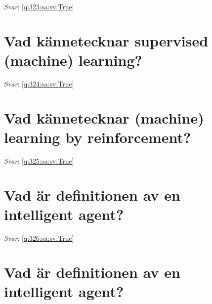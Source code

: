 \documentclass[a4paper,11pt,oneside]{book}
\begin{document}
\begin{sloppypar}
\vspace{1cm}

\textit{Svar}: \autoref{q:323:sa:sv:True}



\section{Vad k\"annetecknar supervised (machine) learning?}

\label{q:324:sa:sv:False}

\vspace{2cm}

\noindent\makebox[\textwidth]{\hrulefill}

\vspace{1cm}

\textit{Svar}: \autoref{q:324:sa:sv:True}



\section{Vad k\"annetecknar (machine) learning by reinforcement?}

\label{q:325:sa:sv:False}

\vspace{2cm}

\noindent\makebox[\textwidth]{\hrulefill}

\vspace{1cm}

\textit{Svar}: \autoref{q:325:sa:sv:True}



\section{Vad \"ar definitionen av en intelligent agent?}

\label{q:326:sa:sv:False}

\vspace{2cm}

\noindent\makebox[\textwidth]{\hrulefill}

\vspace{1cm}

\textit{Svar}: \autoref{q:326:sa:sv:True}



\section{Vad \"ar definitionen av en intelligent agent?}


\end{sloppypar}
\end{document}
